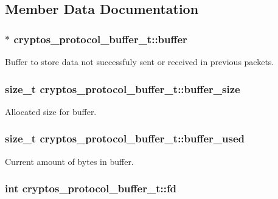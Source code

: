 \subsection{Member Data Documentation}
\hypertarget{structcryptos__protocol__buffer__t_a06a239a5294eecb4b8cbf4e176f601f8}{
\subsubsection[{buffer}]{$\ast$ {\bf cryptos\_\-protocol\_\-buffer\_\-t::buffer}}}
\label{structcryptos__protocol__buffer__t_a06a239a5294eecb4b8cbf4e176f601f8}
Buffer to store data not successfuly sent or received in previous packets. \hypertarget{structcryptos__protocol__buffer__t_a3e75fb39440a18d4eda8b756ffea773d}{
\subsubsection[{buffer\_\-size}]{\setlength{\rightskip}{0pt plus 5cm}size\_\-t {\bf cryptos\_\-protocol\_\-buffer\_\-t::buffer\_\-size}}}
\label{structcryptos__protocol__buffer__t_a3e75fb39440a18d4eda8b756ffea773d}
Allocated size for buffer. \hypertarget{structcryptos__protocol__buffer__t_a537d72e9b1d579ecc4aaf0f00747d3b0}{
\subsubsection[{buffer\_\-used}]{\setlength{\rightskip}{0pt plus 5cm}size\_\-t {\bf cryptos\_\-protocol\_\-buffer\_\-t::buffer\_\-used}}}
\label{structcryptos__protocol__buffer__t_a537d72e9b1d579ecc4aaf0f00747d3b0}
Current amount of bytes in buffer. \hypertarget{structcryptos__protocol__buffer__t_a63a8f5b70415ffa8c59dcd7b783398c8}{
\subsubsection[{fd}]{\setlength{\rightskip}{0pt plus 5cm}int {\bf cryptos\_\-protocol\_\-buffer\_\-t::fd}}}
